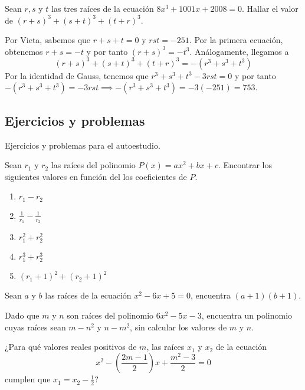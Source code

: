 \begin{example}[AIME II, 2008]
    Sean $r, s$ y $t$ las tres raíces de la ecuación $8x^3 + 1001x + 2008 = 0$.
    Hallar el valor de $(r + s)^3 + (s + t)^3 + (t + r)^3$.
\end{example}
\begin{solution}
    Por Vieta, sabemos que $r +  s + t = 0$ y $r s t = -251$.
    Por la primera ecuación, obtenemos $r + s = -t$ y por tanto $(r + s)^3 = - t^3$.
    Análogamente, llegamos a
    \[
        (r + s)^3 + (s + t)^3 + (t + r)^3 =  -(r^3 + s^3 + t^3)
    \]
    Por la identidad de Gauss, tenemos que $r^3 + s^3 + t^3 - 3rst = 0$ y por tanto $-(r^3 + s^3 + t^3) = -3rst \implies -(r^3 + s^3 + t^3) = -3(-251) = \boxed{753}$.
\end{solution}




\subsection{Ejercicios y problemas}

Ejercicios y problemas para el autoestudio.

\begin{multicols}{2}
    \begin{exercise}
        Sean $r_1$ y $r_2$ las raíces del polinomio $P(x) = ax^2 + bx + c$.
        Encontrar los siguientes valores en función del los coeficientes de $P.$
        \begin{multicols}{3}
            \begin{enumerate}
                \item $r_1 - r_2$
                \item $\frac{1}{r_1} - \frac{1}{r_2}$
                \item $r^2_1 + r^2_2$
                \item $r^3_1 + r^3_2$
                \item $(r_1 + 1)^2 + (r_2 + 1)^2$
            \end{enumerate}
        \end{multicols}
    \end{exercise}

    \begin{problem}
        Sean $a$ y $b$ las raíces de la ecuación $x^2 - 6x + 5 = 0$, encuentra $(a + 1)(b + 1).$
    \end{problem}

    \begin{problem}
        Dado que $m$ y $n$ son raíces del polinomio $6x^2 - 5x - 3$, encuentra un polinomio cuyas raíces sean
        $m - n^2$ y $n - m^2$, sin calcular los valores de $m$ y $n$.
    \end{problem}

    \begin{problem}
        ¿Para qué valores reales positivos de $m$, las raíces $x_1$ y $x_2$ de la ecuación
        \[x^2 - \left( \frac{2m - 1}{2} \right)x  + \frac{m^2 - 3}{2} = 0\]
        cumplen que $x_1 = x_2 - \frac{1}{2}$?
    \end{problem}
\end{multicols}